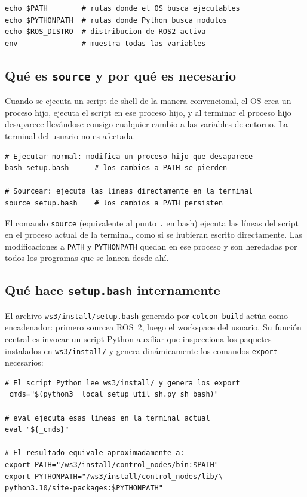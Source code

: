 \begin{lstlisting}[style=bash, caption={Inspección de variables de entorno relevantes.}]
echo $PATH        # rutas donde el OS busca ejecutables
echo $PYTHONPATH  # rutas donde Python busca modulos
echo $ROS_DISTRO  # distribucion de ROS2 activa
env               # muestra todas las variables
\end{lstlisting}

\subsection{Qué es \texttt{source} y por qué es necesario}

Cuando se ejecuta un script de shell de la manera convencional, el OS crea un proceso hijo, ejecuta el script en ese proceso hijo, y al terminar el proceso hijo desaparece llevándose consigo cualquier cambio a las variables de entorno. La terminal del usuario no es afectada.

\begin{lstlisting}[style=bash, caption={Diferencia entre ejecutar y sourcear un script.}]
# Ejecutar normal: modifica un proceso hijo que desaparece
bash setup.bash      # los cambios a PATH se pierden

# Sourcear: ejecuta las lineas directamente en la terminal
source setup.bash    # los cambios a PATH persisten
\end{lstlisting}

El comando \texttt{source} (equivalente al punto \texttt{.} en bash) ejecuta las líneas del script en el proceso actual de la terminal, como si se hubieran escrito directamente. Las modificaciones a \texttt{PATH} y \texttt{PYTHONPATH} quedan en ese proceso y son heredadas por todos los programas que se lancen desde ahí.

\subsection{Qué hace \texttt{setup.bash} internamente}

El archivo \texttt{ws3/install/setup.bash} generado por \texttt{colcon build} actúa como encadenador: primero sourcea ROS~2, luego el workspace del usuario. Su función central es invocar un script Python auxiliar que inspecciona los paquetes instalados en \texttt{ws3/install/} y genera dinámicamente los comandos \texttt{export} necesarios:

\begin{lstlisting}[style=bash, caption={Mecanismo central de \texttt{local\_setup.bash} (simplificado).}]
# El script Python lee ws3/install/ y genera los export
_cmds="$(python3 _local_setup_util_sh.py sh bash)"

# eval ejecuta esas lineas en la terminal actual
eval "${_cmds}"

# El resultado equivale aproximadamente a:
export PATH="/ws3/install/control_nodes/bin:$PATH"
export PYTHONPATH="/ws3/install/control_nodes/lib/\
python3.10/site-packages:$PYTHONPATH"
\end{lstlisting}

